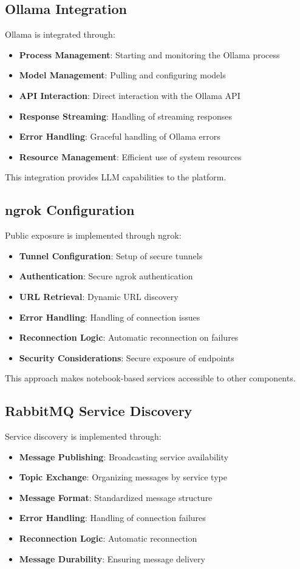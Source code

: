 \subsection{Ollama Integration}
Ollama is integrated through:
\begin{itemize}
    \item \textbf{Process Management}: Starting and monitoring the Ollama process
    \item \textbf{Model Management}: Pulling and configuring models
    \item \textbf{API Interaction}: Direct interaction with the Ollama API
    \item \textbf{Response Streaming}: Handling of streaming responses
    \item \textbf{Error Handling}: Graceful handling of Ollama errors
    \item \textbf{Resource Management}: Efficient use of system resources
\end{itemize}

This integration provides LLM capabilities to the platform.

\subsection{ngrok Configuration}
Public exposure is implemented through ngrok:
\begin{itemize}
    \item \textbf{Tunnel Configuration}: Setup of secure tunnels
    \item \textbf{Authentication}: Secure ngrok authentication
    \item \textbf{URL Retrieval}: Dynamic URL discovery
    \item \textbf{Error Handling}: Handling of connection issues
    \item \textbf{Reconnection Logic}: Automatic reconnection on failures
    \item \textbf{Security Considerations}: Secure exposure of endpoints
\end{itemize}

This approach makes notebook-based services accessible to other components.

\subsection{RabbitMQ Service Discovery}
Service discovery is implemented through:
\begin{itemize}
    \item \textbf{Message Publishing}: Broadcasting service availability
    \item \textbf{Topic Exchange}: Organizing messages by service type
    \item \textbf{Message Format}: Standardized message structure
    \item \textbf{Error Handling}: Handling of connection failures
    \item \textbf{Reconnection Logic}: Automatic reconnection
    \item \textbf{Message Durability}: Ensuring message delivery
\end{itemize}

